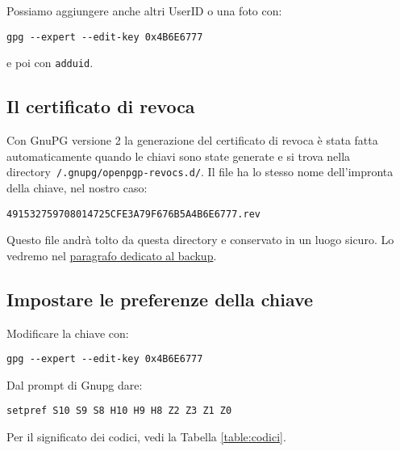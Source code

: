\documentclass[a4paper,10pt]{article}
\begin{document}
Possiamo aggiungere anche altri UserID o una foto con:

\begin{lstlisting}
gpg --expert --edit-key 0x4B6E6777
\end{lstlisting}

e poi con \texttt{adduid}.

\subsection{Il certificato di revoca}
\label{sec:certificato-revoca}

Con GnuPG versione 2 la generazione del certificato di revoca è stata fatta automaticamente quando le chiavi sono state generate e si trova nella directory\newline \texttt{~/.gnupg/openpgp-revocs.d/}. Il file ha lo stesso nome dell'impronta della chiave, nel nostro caso:

\begin{lstlisting}
491532759708014725CFE3A79F676B5A4B6E6777.rev
\end{lstlisting}

Questo file andrà tolto da questa directory e conservato in un luogo sicuro. Lo vedremo nel \hyperref[sec:backup-certificato-revoca]{paragrafo dedicato al backup}.

\subsection{Impostare le preferenze della chiave}

Modificare la chiave con:

\begin{lstlisting}
gpg --expert --edit-key 0x4B6E6777
\end{lstlisting}

Dal prompt di Gnupg dare:

\begin{lstlisting}
setpref S10 S9 S8 H10 H9 H8 Z2 Z3 Z1 Z0
\end{lstlisting}

Per il significato dei codici, vedi la Tabella \ref{table:codici}.
\end{document}
